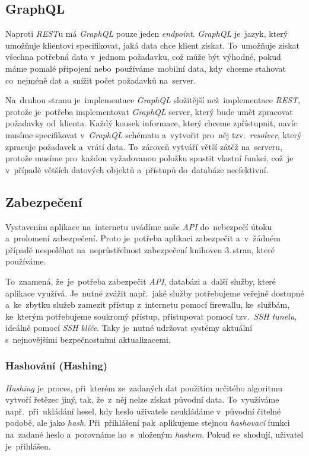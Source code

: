 \documentclass[10pt,a4paper]{article}
\begin{document}
        \subsection{GraphQL}
        Naproti \emph{REST}u má \emph{GraphQL} pouze jeden \emph{endpoint}. \emph{GraphQL} je~jazyk, který umožňuje klientovi specifikovat, jaká data chce klient získat. To~umožňuje získat všechna potřebná data v~jednom požadavku, což může být výhodné, pokud máme pomalé připojení nebo~používáme~mobilní data, kdy~chceme stahovat co~nejméně dat a~snížit počet požadavků na~server.

        Na~druhou stranu je~implementace \emph{GraphQL} složitější než~implementace \emph{REST}, protože je~potřeba implementovat \emph{GraphQL} server, který bude umět zpracovat požadavky od~klienta. Každý kousek informace, který chceme zpřístupnit, navíc musíme specifikovat v~\emph{GraphQL} schématu a~vytvořit pro~něj tzv.~\emph{resolver}, který zpracuje požadavek a~vrátí data. To~zároveň vytváří větší zátěž na~serveru, protože musíme pro~každou vyžadovanou položku spustit vlastní funkci, což~je v~případě větších datových objektů a~přístupů do~databáze neefektivní.

        \subsection{Zabezpečení}
        Vystavením aplikace na~internetu uvádíme naše \emph{API} do~nebezpečí útoku a~prolomení zabezpečení. Proto je~potřeba aplikaci zabezpečit a~v~žádném případě nespoléhat na~neprůstřelnost zabezpečení knihoven 3.\,stran, které používáme.
        
        To~znamená, že~je~potřeba zabezpečit \emph{API}, databázi a~další služby, které aplikace využívá. Je~nutné zvážit např.~jaké služby potřebujeme veřejně dostupné a~ke~zbytku služeb zamezit přístup z~internetu pomocí firewallu, ke~službám, ke~kterým potřebujeme soukromý přístup, přistupovat pomocí tzv.~\emph{SSH tunelu}, ideálně pomocí \emph{SSH klíče}. Taky je~nutné udržovat systémy aktuální s~nejnovějšími bezpečnostními aktualizacemi.
            
        \subsubsection{Hashování (Hashing)}
        \emph{Hashing} je~proces, při~kterém ze~zadaných dat použitím určitého algoritmu vytvoří řetězec jiný, tak, že~z~něj nelze získat původní data. To~využíváme např.~při~ukládání hesel, kdy heslo uživatele neukládáme v~původní čitelné podobě, ale jako \emph{hash}. Při~přihlášení pak~aplikujeme stejnou \emph{hashovací} funkci na~zadané heslo a~porovnáme ho~s~uloženým \emph{hashem}. Pokud se~shodují, uživatel je~přihlášen.
        
\end{document}
